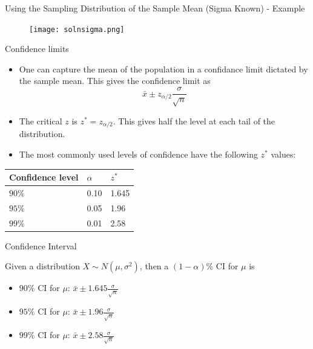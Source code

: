\documentclass[ignorenonframetext,]{beamer}
\providecommand{\tightlist}{%
  \setlength{\itemsep}{0pt}\setlength{\parskip}{0pt}}
\begin{document}
\begin{frame}{Using the Sampling Distribution of the Sample Mean (Sigma
Known) - Example}

\begin{figure}
\centering
\texttt{[image: solnsigma.png]}
\caption{}
\end{figure}

\end{frame}

\begin{frame}{Confidence limits}

\begin{itemize}
\item
  One can capture the mean of the population in a confidance limit
  dictated by the sample mean. This gives the confidence limit as
  \[\bar{x}\pm z_{\alpha/2}\frac{\sigma}{\sqrt{n}}\]
\item
  The critical \(z\) is \(z^*=z_{\alpha/2}\). This gives half the level
  at each tail of the distribution.
\end{itemize}

\end{frame}

\begin{frame}

\begin{itemize}
\tightlist
\item
  The most commonly used levels of confidence have the following \(z^*\)
  values:
\end{itemize}

\begin{longtable}[]{@{}lll@{}}
\toprule
Confidence level & \(\alpha\) & \(z^*\)\tabularnewline
\midrule
\endhead
\(90\%\) & 0.10 & 1.645\tabularnewline
\(95\%\) & 0.05 & 1.96\tabularnewline
\(99\%\) & 0.01 & 2.58\tabularnewline
\bottomrule
\end{longtable}

\end{frame}

\begin{frame}{Confidence Interval}

Given a distribution \(X\sim N(\mu,\sigma^2)\), then a \((1-\alpha)\%\)
CI for \(\mu\) is

\begin{itemize}
\item
  \(90\%\) CI for \(\mu\): \(\bar{x}\pm 1.645\frac{\sigma}{\sqrt{n}}\)
\item
  \(95\%\) CI for \(\mu\): \(\bar{x}\pm 1.96\frac{\sigma}{\sqrt{n}}\)
\item
  \(99\%\) CI for \(\mu\): \(\bar{x}\pm 2.58\frac{\sigma}{\sqrt{n}}\)
\end{itemize}

\end{frame}
\end{document}
